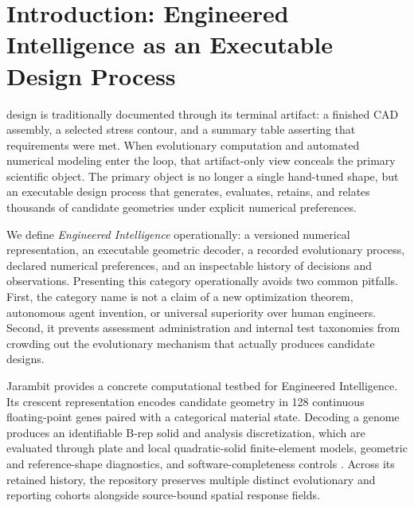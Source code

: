 \section{Introduction: Engineered Intelligence as an Executable Design Process}
\label{sec:introduction}
 design is traditionally documented through its terminal artifact: a finished CAD assembly, a selected stress contour, and a summary table asserting that requirements were met. When evolutionary computation and automated numerical modeling enter the loop, that artifact-only view conceals the primary scientific object. The primary object is no longer a single hand-tuned shape, but an executable design process that generates, evaluates, retains, and relates thousands of candidate geometries under explicit numerical preferences.

We define \emph{Engineered Intelligence} operationally: a versioned numerical representation, an executable geometric decoder, a recorded evolutionary process, declared numerical preferences, and an inspectable history of decisions and observations. Presenting this category operationally avoids two common pitfalls. First, the category name is not a claim of a new optimization theorem, autonomous agent invention, or universal superiority over human engineers. Second, it prevents assessment administration and internal test taxonomies from crowding out the evolutionary mechanism that actually produces candidate designs.

Jarambit provides a concrete computational testbed for Engineered Intelligence. Its crescent representation encodes candidate geometry in 128 continuous floating-point genes paired with a categorical material state. Decoding a genome produces an identifiable B-rep solid and analysis discretization, which are evaluated through plate and local quadratic-solid finite-element models, geometric and reference-shape diagnostics, and software-completeness controls \cite{repo}. Across its retained history, the repository preserves multiple distinct evolutionary and reporting cohorts alongside source-bound spatial response fields.

